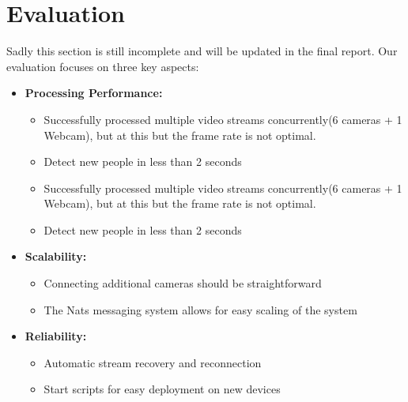 \documentclass[conference]{IEEEtran}
\begin{document}
\section{Evaluation}
\label{sec:evaluation}
Sadly this section is still incomplete and will be updated in the final report.
Our evaluation focuses on three key aspects:

\begin{itemize}
      \item \textbf{Processing Performance:}
            \begin{itemize}
                  \item Successfully processed multiple video streams concurrently(6 cameras + 1 Webcam), but at this but the frame rate is not optimal.
                  \item Detect new people in less than 2 seconds
                  \item Successfully processed multiple video streams concurrently(6 cameras + 1 Webcam), but at this but the frame rate is not optimal.
                  \item Detect new people in less than 2 seconds
            \end{itemize}

      \item \textbf{Scalability:}
            \begin{itemize}
                  \item Connecting additional cameras should be straightforward
                  \item The Nats messaging system allows for easy scaling of the system
            \end{itemize}
      \item \textbf{Reliability:}
            \begin{itemize}
                  \item Automatic stream recovery and reconnection
                  \item Start scripts for easy deployment on new devices
            \end{itemize}
\end{itemize}
\end{document}
